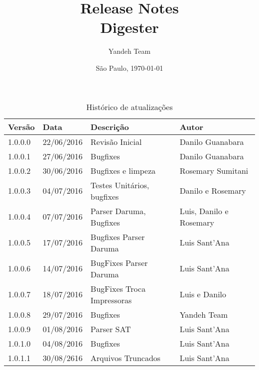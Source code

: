 \documentclass{article}      %
\title{Release Notes \\
      Digester \versiondigester}  %
\author{Yandeh Team}              %
\date{São Paulo, \today}
\begin{document}

\maketitle                   %

\thispagestyle{firststyle}


\begin{table}[!ht]
\centering
\caption{Histórico de atualizações}
\label{my-label}
\begin{tabular}{|l|l|l|l|}
\hline
\textbf{Versão} & \textbf{Data} & \textbf{Descrição}                & \textbf{Autor}                                       \\ \hline
1.0.0.0           & 22/06/2016    & Revisão Inicial                 & Danilo Guanabara                                     \\ \hline
1.0.0.1           & 27/06/2016    & Bugfixes                        & Danilo Guanabara                                     \\ \hline
1.0.0.2           & 30/06/2016    & Bugfixes e limpeza              & Rosemary Sumitani                                    \\ \hline
1.0.0.3           & 04/07/2016    & Testes Unitários, bugfixes      & Danilo e Rosemary                                    \\ \hline
1.0.0.4           & 07/07/2016    & Parser Daruma, Bugfixes         & Luis, Danilo e Rosemary                              \\ \hline
1.0.0.5           & 17/07/2016    & Bugfixes Parser Daruma          & Luis Sant'Ana                                        \\ \hline
1.0.0.6           & 14/07/2016    & BugFixes Parser Daruma          & Luis Sant'Ana                                        \\ \hline  
1.0.0.7           & 18/07/2016    & BugFixes Troca Impressoras      & Luis e Danilo                                        \\ \hline
1.0.0.8           & 29/07/2016    & Bugfixes                        & Yandeh Team                                          \\ \hline
1.0.0.9           & 01/08/2016    & Parser SAT                      & Luis Sant'Ana                                        \\ \hline
1.0.1.0           & 04/08/2016    & Bugfixes                        & Luis Sant'Ana                                        \\ \hline
1.0.1.1           & 30/08/2616    & Arquivos Truncados              & Luis Sant'Ana                                        \\ \hline        
\end{tabular}
\end{table}
\end{document}
